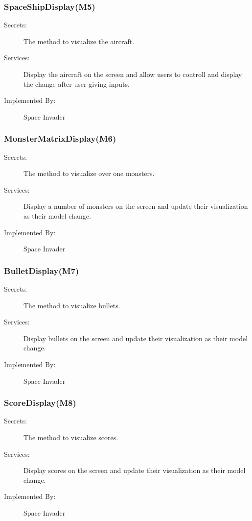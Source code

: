 \documentclass[12pt]{article}
\begin{document}
\subsubsection{SpaceShipDisplay(M5)}
\begin{description}
\item[Secrets:] The method to visualize the aircraft.
\item[Services:] Display the aircraft on the screen and allow users to controll and display the change after user giving inputs.
\item[Implemented By:] Space Invader
\end{description}

\subsubsection{MonsterMatrixDisplay(M6)}
\begin{description}
\item[Secrets:] The method to visualize over one monsters.
\item[Services:] Display a number of monsters on the screen and update their visualization as their model change.
\item[Implemented By:] Space Invader
\end{description}

\subsubsection{BulletDisplay(M7)}
\begin{description}
\item[Secrets:] The method to visualize bullets.
\item[Services:] Display bullets on the screen and update their visualization as their model change.
\item[Implemented By:] Space Invader
\end{description}

\subsubsection{ScoreDisplay(M8)}
\begin{description}
\item[Secrets:] The method to visualize scores.
\item[Services:] Display scores on the screen and update their visualization as their model change.
\item[Implemented By:] Space Invader
\end{description}
\end{document}
